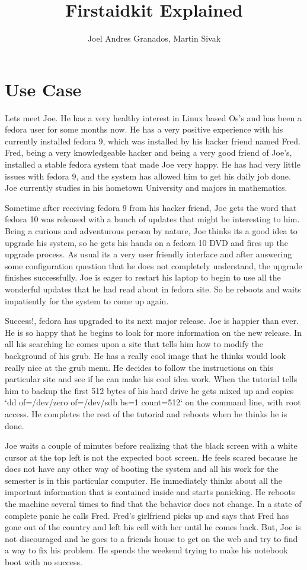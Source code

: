 \documentclass[a4paper,13pt]{article}
\title{Firstaidkit Explained}
\author{Joel Andres Granados, Martin Sivak}
\begin{document}
\maketitle

\section{Use Case}
Lets meet Joe.  He has a very healthy interest in Linux based Os's and has been a fedora user for some months now.  He has a very positive experience with his currently installed fedora 9, which was installed by his hacker friend named Fred.  Fred, being a very knowledgeable hacker and being a very good friend of Joe's, installed a stable fedora system that made Joe very happy.  He has had very little issues with fedora 9, and the system has allowed him to get his daily job done.  Joe currently studies in his hometown University and majors in mathematics.

Sometime after receiving fedora 9 from his hacker friend, Joe gets the word that fedora 10 was released with a bunch of updates that might be interesting to him.  Being a curious and adventurous person by nature, Joe thinks its a good idea to upgrade his system, so he gets his hands on a fedora 10 DVD and fires up the upgrade process.  As usual its a very user friendly interface and after answering some configuration question that he does not completely understand, the upgrade finishes successfully.  Joe is eager to restart his laptop to begin to use all the wonderful updates that he had read about in fedora site.  So he reboots and waits impatiently for the system to come up again.

Success!, fedora has upgraded to its next major release.  Joe is happier than ever.  He is so happy that he begins to look for more information on the new release.  In all his searching he comes upon a site that tells him how to modify the background of his grub.  He has a really cool image that he thinks would look really nice at the grub menu.  He decides to follow the instructions on this particular site and see if he can make his cool idea work.  When the tutorial tells him to backup the first 512 bytes of his hard drive he gets mixed up and copies `dd of=/dev/zero of=/dev/sdb bs=1 count=512` on the command line, with root access.  He completes the rest of the tutorial and reboots when he thinks he is done.

Joe waits a couple of minutes before realizing that the black screen with a white cursor at the top left is not the expected boot screen.  He feels scared because he does not have any other way of booting the system and all his work for the semester is in this particular computer.  He immediately thinks about all the important information that is contained inside and starts panicking.  He reboots the machine several times to find that the behavior does not change.  In a state of complete panic he calls Fred.  Fred's girlfriend picks up and says that Fred has gone out of the country and left his cell with her until he comes back.  But, Joe is not discouraged and he goes to a friends house to get on the web and try to find a way to fix his problem.  He spends the weekend trying to make his notebook boot with no success.
\end{document}

